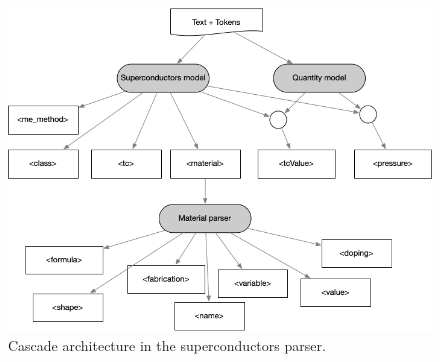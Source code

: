 \documentclass{article}
\begin{document}
\begin{figure}[ht]
\label{fig:extraction-ml-models-cascade-architecture}
\includegraphics[width=\textwidth]{extraction-schema-2}
\caption{Cascade architecture in the superconductors parser.}
\end{figure}
\end{document}
